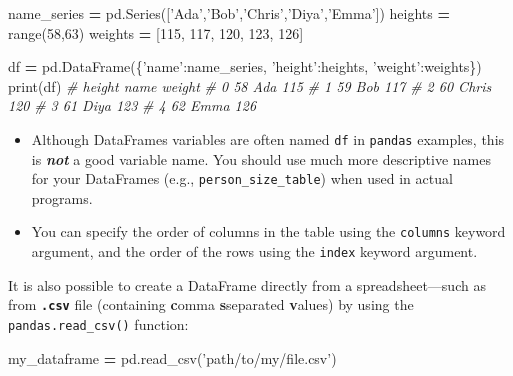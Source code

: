 \documentclass[]{book}
\newenvironment{Shaded}{\begin{snugshade}}{\end{snugshade}}
\newcommand{\DecValTok}[1]{\textcolor[rgb]{0.00,0.00,0.81}{#1}}
\newcommand{\StringTok}[1]{\textcolor[rgb]{0.31,0.60,0.02}{#1}}
\newcommand{\CommentTok}[1]{\textcolor[rgb]{0.56,0.35,0.01}{\textit{#1}}}
\newcommand{\OperatorTok}[1]{\textcolor[rgb]{0.81,0.36,0.00}{\textbf{#1}}}
\newcommand{\BuiltInTok}[1]{#1}
\newcommand{\NormalTok}[1]{#1}
\providecommand{\tightlist}{%
  \setlength{\itemsep}{0pt}\setlength{\parskip}{0pt}}
\begin{document}
\begin{Shaded}
\begin{Highlighting}[]
\NormalTok{name_series }\OperatorTok{=}\NormalTok{ pd.Series([}\StringTok{'Ada'}\NormalTok{,}\StringTok{'Bob'}\NormalTok{,}\StringTok{'Chris'}\NormalTok{,}\StringTok{'Diya'}\NormalTok{,}\StringTok{'Emma'}\NormalTok{])}
\NormalTok{heights }\OperatorTok{=} \BuiltInTok{range}\NormalTok{(}\DecValTok{58}\NormalTok{,}\DecValTok{63}\NormalTok{)}
\NormalTok{weights }\OperatorTok{=}\NormalTok{ [}\DecValTok{115}\NormalTok{, }\DecValTok{117}\NormalTok{, }\DecValTok{120}\NormalTok{, }\DecValTok{123}\NormalTok{, }\DecValTok{126}\NormalTok{]}

\NormalTok{df }\OperatorTok{=}\NormalTok{ pd.DataFrame(\{}\StringTok{'name'}\NormalTok{:name_series, }\StringTok{'height'}\NormalTok{:heights, }\StringTok{'weight'}\NormalTok{:weights\})}
\BuiltInTok{print}\NormalTok{(df)}
    \CommentTok{#    height   name  weight}
    \CommentTok{# 0      58    Ada     115}
    \CommentTok{# 1      59    Bob     117}
    \CommentTok{# 2      60  Chris     120}
    \CommentTok{# 3      61   Diya     123}
    \CommentTok{# 4      62   Emma     126}
\end{Highlighting}
\end{Shaded}

\begin{itemize}
\tightlist
\item
  Although DataFrames variables are often named \texttt{df} in
  \texttt{pandas} examples, this is \textbf{\emph{not}} a good variable
  name. You should use much more descriptive names for your DataFrames
  (e.g., \texttt{person\_size\_table}) when used in actual programs.
\item
  You can specify the order of columns in the table using the
  \texttt{columns} keyword argument, and the order of the rows using the
  \texttt{index} keyword argument.
\end{itemize}

It is also possible to create a DataFrame directly from a
spreadsheet---such as from \textbf{\texttt{.csv}} file (containing
\textbf{c}omma \textbf{s}separated \textbf{v}alues) by using the
\texttt{pandas.read\_csv()} function:

\begin{Shaded}
\begin{Highlighting}[]
\NormalTok{my_dataframe }\OperatorTok{=}\NormalTok{ pd.read_csv(}\StringTok{'path/to/my/file.csv'}\NormalTok{)}
\end{Highlighting}
\end{Shaded}
\end{document}

